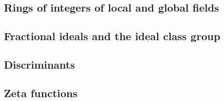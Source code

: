







% 





\subsection{Rings of integers of local and global fields}






\subsection{Fractional ideals and the ideal class group}






\subsection{Discriminants}



\subsection{Zeta functions}





